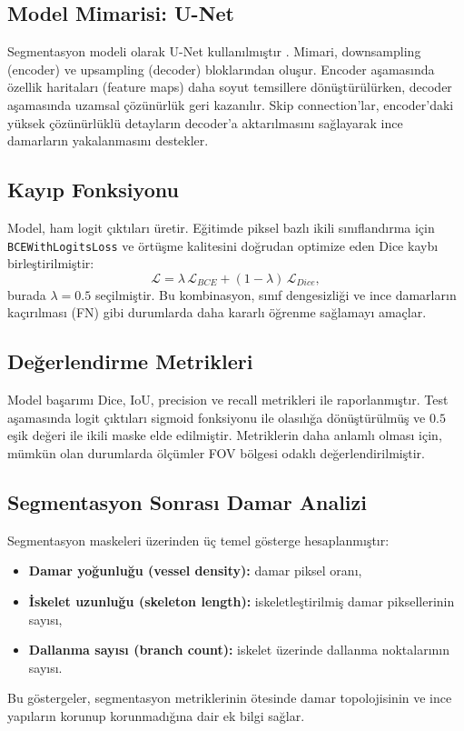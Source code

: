 \subsection{Model Mimarisi: U-Net}
Segmentasyon modeli olarak U-Net kullanılmıştır \cite{ronneberger2015unet}. Mimari, downsampling (encoder) ve upsampling (decoder) bloklarından oluşur. Encoder aşamasında özellik haritaları (feature maps) daha soyut temsillere dönüştürülürken, decoder aşamasında uzamsal çözünürlük geri kazanılır. Skip connection'lar, encoder'daki yüksek çözünürlüklü detayların decoder'a aktarılmasını sağlayarak ince damarların yakalanmasını destekler.

\subsection{Kayıp Fonksiyonu}
Model, ham logit çıktıları üretir. Eğitimde piksel bazlı ikili sınıflandırma için \texttt{BCEWith\-Logits\-Loss} ve örtüşme kalitesini doğrudan optimize eden Dice kaybı birleştirilmiştir:
\begin{equation}
\mathcal{L} = \lambda \, \mathcal{L}_{BCE} + (1-\lambda)\, \mathcal{L}_{Dice},
\end{equation}
burada $\lambda=0.5$ seçilmiştir. Bu kombinasyon, sınıf dengesizliği ve ince damarların kaçırılması (FN) gibi durumlarda daha kararlı öğrenme sağlamayı amaçlar.

\subsection{Değerlendirme Metrikleri}
Model başarımı Dice, IoU, precision ve recall metrikleri ile raporlanmıştır. Test aşamasında logit çıktıları sigmoid fonksiyonu ile olasılığa dönüştürülmüş ve $0.5$ eşik değeri ile ikili maske elde edilmiştir. Metriklerin daha anlamlı olması için, mümkün olan durumlarda ölçümler FOV bölgesi odaklı değerlendirilmiştir.

\subsection{Segmentasyon Sonrası Damar Analizi}
Segmentasyon maskeleri üzerinden üç temel gösterge hesaplanmıştır:
\begin{itemize}
    \item \textbf{Damar yoğunluğu (vessel density):} damar piksel oranı,
    \item \textbf{İskelet uzunluğu (skeleton length):} iskeletleştirilmiş damar piksellerinin sayısı,
    \item \textbf{Dallanma sayısı (branch count):} iskelet üzerinde dallanma noktalarının sayısı.
\end{itemize}
Bu göstergeler, segmentasyon metriklerinin ötesinde damar topolojisinin ve ince yapıların korunup korunmadığına dair ek bilgi sağlar.
